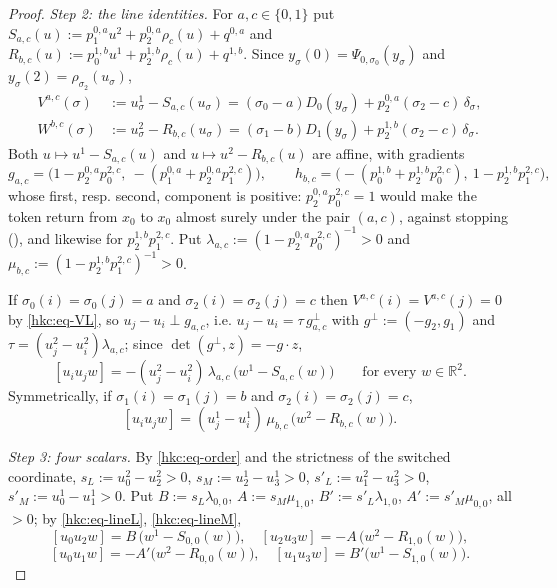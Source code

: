 \begin{proof}
\emph{Step 2: the line identities.} For $a,c\in\{0,1\}$ put
$S_{a,c}(u):=p^{0,a}_1u^2+p^{0,a}_2\rho_c(u)+q^{0,a}$ and
$R_{b,c}(u):=p^{1,b}_0u^1+p^{1,b}_2\rho_c(u)+q^{1,b}$. Since
$y_\sigma(0)=\Psi_{0,\sigma_0}(y_\sigma)$ and $y_\sigma(2)=\rho_{\sigma_2}(u_\sigma)$,
\begin{align}
  V^{a,c}(\sigma)&:=u^1_\sigma-S_{a,c}(u_\sigma)
   =(\sigma_0-a)D_0(y_\sigma)+p^{0,a}_2(\sigma_2-c)\,\delta_\sigma,
   \label{hkc:eq-VL}\\
  W^{b,c}(\sigma)&:=u^2_\sigma-R_{b,c}(u_\sigma)
   =(\sigma_1-b)D_1(y_\sigma)+p^{1,b}_2(\sigma_2-c)\,\delta_\sigma.
   \label{hkc:eq-VM}
\end{align}
Both $u\mapsto u^1-S_{a,c}(u)$ and $u\mapsto u^2-R_{b,c}(u)$ are affine, with
gradients
\[
  g_{a,c}=\bigl(1-p^{0,a}_2p^{2,c}_0,\ -(p^{0,a}_1+p^{0,a}_2p^{2,c}_1)\bigr),
  \qquad
  h_{b,c}=\bigl(-(p^{1,b}_0+p^{1,b}_2p^{2,c}_0),\ 1-p^{1,b}_2p^{2,c}_1\bigr),
\]
whose first, resp. second, component is positive: $p^{0,a}_2p^{2,c}_0=1$ would
make the token return from $x_0$ to $x_0$ almost surely under the pair
$(a,c)$, against stopping (), and likewise for
$p^{1,b}_2p^{2,c}_1$. Put $\lambda_{a,c}:=(1-p^{0,a}_2p^{2,c}_0)^{-1}>0$ and
$\mu_{b,c}:=(1-p^{1,b}_2p^{2,c}_1)^{-1}>0$.

If $\sigma_0(i)=\sigma_0(j)=a$ and $\sigma_2(i)=\sigma_2(j)=c$ then
$V^{a,c}(i)=V^{a,c}(j)=0$ by \eqref{hkc:eq-VL}, so $u_j-u_i\perp g_{a,c}$,
i.e. $u_j-u_i=\tau\,g_{a,c}^{\perp}$ with $g^{\perp}:=(-g_2,g_1)$ and
$\tau=(u^2_j-u^2_i)\lambda_{a,c}$; since
$\det(g^{\perp},z)=-g\cdot z$,
\begin{equation}\label{hkc:eq-lineL}
  [u_iu_jw]=-(u^2_j-u^2_i)\,\lambda_{a,c}\,\bigl(w^1-S_{a,c}(w)\bigr)
  \qquad\text{for every }w\in\mathbb R^2 .
\end{equation}
Symmetrically, if $\sigma_1(i)=\sigma_1(j)=b$ and $\sigma_2(i)=\sigma_2(j)=c$,
\begin{equation}\label{hkc:eq-lineM}
  [u_iu_jw]=(u^1_j-u^1_i)\,\mu_{b,c}\,\bigl(w^2-R_{b,c}(w)\bigr).
\end{equation}

\emph{Step 3: four scalars.} By \eqref{hkc:eq-order} and the strictness of the
switched coordinate,
$s_L:=u^2_0-u^2_2>0$, $s_M:=u^1_2-u^1_3>0$, $s'_L:=u^2_1-u^2_3>0$,
$s'_M:=u^1_0-u^1_1>0$. Put $B:=s_L\lambda_{0,0}$, $A:=s_M\mu_{1,0}$,
$B':=s'_L\lambda_{1,0}$, $A':=s'_M\mu_{0,0}$, all $>0$; by
\eqref{hkc:eq-lineL}, \eqref{hkc:eq-lineM},
\[
 [u_0u_2w]=B\,\bigl(w^1-S_{0,0}(w)\bigr),\quad
 [u_2u_3w]=-A\,\bigl(w^2-R_{1,0}(w)\bigr),
\]
\[
 [u_0u_1w]=-A'\bigl(w^2-R_{0,0}(w)\bigr),\quad
 [u_1u_3w]=B'\bigl(w^1-S_{1,0}(w)\bigr).
\]


\end{proof}
